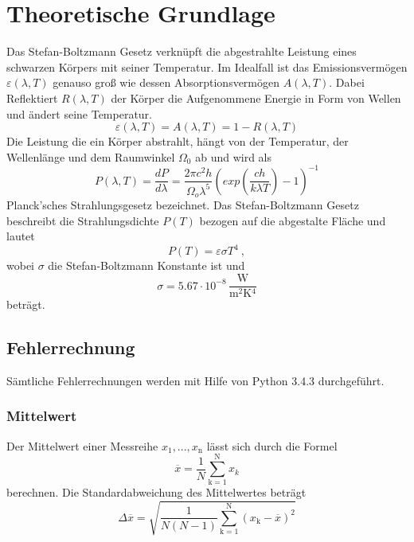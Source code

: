 \section{Theoretische Grundlage}
\label{sec:Theorie}
Das Stefan-Boltzmann Gesetz verknüpft die abgestrahlte Leistung eines schwarzen Körpers mit seiner Temperatur. Im Idealfall ist das Emissionsvermögen $\varepsilon(\lambda, T)$ genauso groß wie dessen Absorptionsvermögen $A(\lambda, T)$. Dabei Reflektiert $R(\lambda,T)$ der Körper die Aufgenommene Energie in Form von Wellen und ändert seine Temperatur.
\begin{equation}
  \varepsilon(\lambda, T) = A(\lambda, T) = 1-R(\lambda, T)
  \label{eqn:emission}
\end{equation}
Die Leistung die ein Körper abstrahlt, hängt von der Temperatur, der Wellenlänge und dem Raumwinkel $\Omega_0$ ab und wird als
\begin{equation}
  P(\lambda, T) = \frac{dP}{d \lambda} = \frac{2 \pi c^2 h}{\Omega_o \lambda^5}\left( exp\left( \frac{c h}{k \lambda T} \right) -1 \right)^{-1}
  \label{eqn:planck}
\end{equation}
Planck'sches Strahlungsgesetz bezeichnet. 
Das Stefan-Boltzmann Gesetz beschreibt die Strahlungsdichte $P(T)$ bezogen auf die abgestalte Fläche und lautet
\begin{equation}
  P(T) = \varepsilon \sigma T^4 \ ,
  \label{eqn:strahlungsgesetz}
\end{equation}
wobei $\sigma$ die Stefan-Boltzmann Konstante ist und 
\begin{equation}
  \sigma = 5.67 \cdot 10^{-8} \, \frac{\text{W}}{\text{m$^2$K$^4$}}
\end{equation}
beträgt.
\subsection{Fehlerrechnung}
Sämtliche Fehlerrechnungen werden mit Hilfe von Python 3.4.3 durchgeführt.
\subsubsection{Mittelwert}
Der Mittelwert einer Messreihe $x_\text{1}, ... ,x_\text{n}$ lässt sich durch die Formel
\begin{equation}
	\overline{x} = \frac{1}{N} \sum_{\text{k}=1}^\text{N} x_k
	\label{eqn:ave}
\end{equation}
berechnen. Die Standardabweichung des Mittelwertes beträgt
\begin{equation}
	\Delta \overline{x} = \sqrt{ \frac{1}{N(N-1)} \sum_{\text{k}=1}^\text{N} (x_\text{k} - \overline{x})^2}
	\label{eqn:std}
\end{equation}
